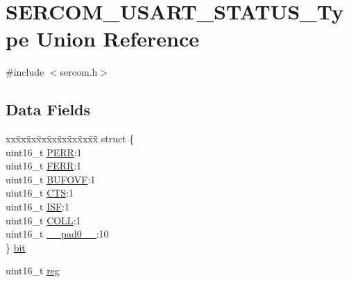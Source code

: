 \hypertarget{union_s_e_r_c_o_m___u_s_a_r_t___s_t_a_t_u_s___type}{}\section{S\+E\+R\+C\+O\+M\+\_\+\+U\+S\+A\+R\+T\+\_\+\+S\+T\+A\+T\+U\+S\+\_\+\+Type Union Reference}
\label{union_s_e_r_c_o_m___u_s_a_r_t___s_t_a_t_u_s___type}


{\ttfamily \#include $<$sercom.\+h$>$}

\subsection*{Data Fields}
\begin{DoxyCompactItemize}
\item 
\begin{tabbing}
xx\=xx\=xx\=xx\=xx\=xx\=xx\=xx\=xx\=\kill
struct \{\\
\>uint16\_t \mbox{\hyperlink{union_s_e_r_c_o_m___u_s_a_r_t___s_t_a_t_u_s___type_a30526a86a6430db23e3e78fdf9783c5b}{PERR}}:1\\
\>uint16\_t \mbox{\hyperlink{union_s_e_r_c_o_m___u_s_a_r_t___s_t_a_t_u_s___type_ab3d513f73b000612e955650fb41c093f}{FERR}}:1\\
\>uint16\_t \mbox{\hyperlink{union_s_e_r_c_o_m___u_s_a_r_t___s_t_a_t_u_s___type_ac1d0751d41834397720be435a519c291}{BUFOVF}}:1\\
\>uint16\_t \mbox{\hyperlink{union_s_e_r_c_o_m___u_s_a_r_t___s_t_a_t_u_s___type_a979a6e03fc269fb14bb148492dfb6981}{CTS}}:1\\
\>uint16\_t \mbox{\hyperlink{union_s_e_r_c_o_m___u_s_a_r_t___s_t_a_t_u_s___type_aeff7dda42f50e9833d9f83e301948a4d}{ISF}}:1\\
\>uint16\_t \mbox{\hyperlink{union_s_e_r_c_o_m___u_s_a_r_t___s_t_a_t_u_s___type_ad5762710d2f2bd7bd5fb5d427e646c94}{COLL}}:1\\
\>uint16\_t \mbox{\hyperlink{union_s_e_r_c_o_m___u_s_a_r_t___s_t_a_t_u_s___type_a77132c2c26a75f5b8751b235cda23828}{\_\_pad0\_\_}}:10\\
\} \mbox{\hyperlink{union_s_e_r_c_o_m___u_s_a_r_t___s_t_a_t_u_s___type_a2ca47e121fd8979ec83440c403d8033a}{bit}}\\

\end{tabbing}\item 
uint16\+\_\+t \mbox{\hyperlink{union_s_e_r_c_o_m___u_s_a_r_t___s_t_a_t_u_s___type_a11760f5020019f4aa8cb02e694f7cc44}{reg}}
\end{DoxyCompactItemize}


